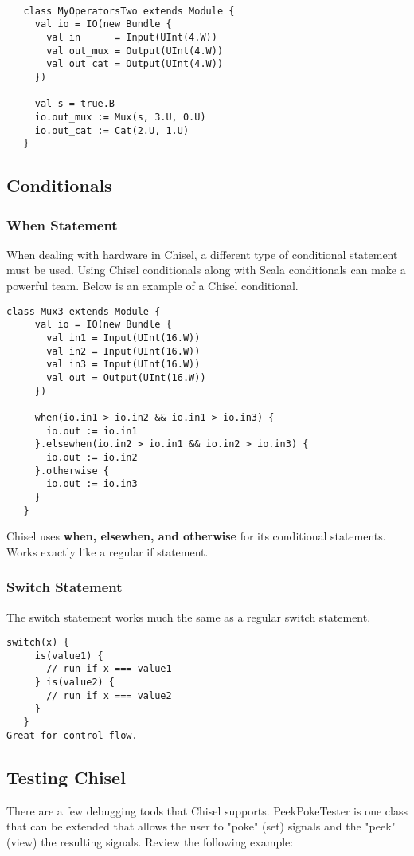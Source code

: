 \documentclass[12pt, letterpaper]{report}
\begin{document}
\begin{lstlisting}[style=scala]

   class MyOperatorsTwo extends Module {
     val io = IO(new Bundle {
       val in      = Input(UInt(4.W))
       val out_mux = Output(UInt(4.W))
       val out_cat = Output(UInt(4.W))
     })

     val s = true.B
     io.out_mux := Mux(s, 3.U, 0.U) 
     io.out_cat := Cat(2.U, 1.U)    
   }
\end{lstlisting}

\subsection{Conditionals}
\subsubsection{When Statement}
When dealing with hardware in Chisel, a different type of conditional statement must be used. Using Chisel conditionals along with Scala conditionals can make a powerful
team. Below is an example of a Chisel conditional.

\begin{lstlisting}[style=scala]
   class Mux3 extends Module {
     val io = IO(new Bundle {
       val in1 = Input(UInt(16.W))
       val in2 = Input(UInt(16.W))
       val in3 = Input(UInt(16.W))
       val out = Output(UInt(16.W))
     })
    
     when(io.in1 > io.in2 && io.in1 > io.in3) {
       io.out := io.in1  
     }.elsewhen(io.in2 > io.in1 && io.in2 > io.in3) {
       io.out := io.in2 
     }.otherwise {
       io.out := io.in3
     }
   }
\end{lstlisting}
Chisel uses \textbf{when, elsewhen, and otherwise} for its conditional statements. Works exactly like a regular if statement.

\subsubsection{Switch Statement}
The switch statement works much the same as a regular switch statement.

\begin{lstlisting}[style=scala]
   switch(x) {
     is(value1) {
       // run if x === value1
     } is(value2) {
       // run if x === value2
     }
   }
Great for control flow.
\end{lstlisting}

\subsection{Testing Chisel}
There are a few debugging tools that Chisel supports. PeekPokeTester is one class that can be extended that allows the user 
to "poke" (set) signals and the "peek" (view) the resulting signals.
Review the following example:
\end{document}
